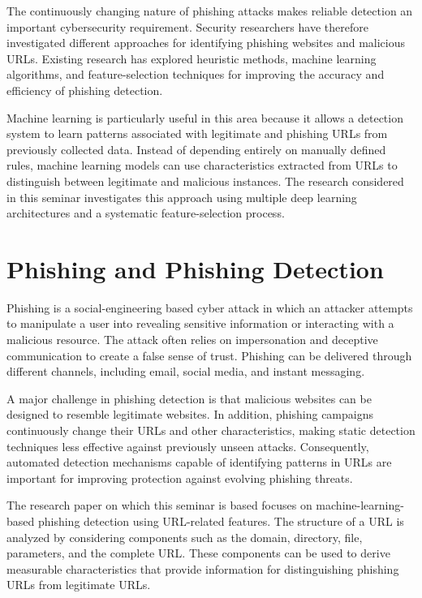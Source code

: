 \documentclass[12pt,a4paper]{report}
\begin{document}
The continuously changing nature of phishing attacks makes reliable
detection an important cybersecurity requirement. Security
researchers have therefore investigated different approaches for
identifying phishing websites and malicious URLs. Existing research
has explored heuristic methods, machine learning algorithms, and
feature-selection techniques for improving the accuracy and
efficiency of phishing detection.

Machine learning is particularly useful in this area because it
allows a detection system to learn patterns associated with
legitimate and phishing URLs from previously collected data. Instead
of depending entirely on manually defined rules, machine learning
models can use characteristics extracted from URLs to distinguish
between legitimate and malicious instances. The research considered
in this seminar investigates this approach using multiple deep
learning architectures and a systematic feature-selection process.

\section{Phishing and Phishing Detection}

Phishing is a social-engineering based cyber attack in which an
attacker attempts to manipulate a user into revealing sensitive
information or interacting with a malicious resource. The attack
often relies on impersonation and deceptive communication to create
a false sense of trust. Phishing can be delivered through different
channels, including email, social media, and instant messaging.

A major challenge in phishing detection is that malicious websites
can be designed to resemble legitimate websites. In addition,
phishing campaigns continuously change their URLs and other
characteristics, making static detection techniques less effective
against previously unseen attacks. Consequently, automated
detection mechanisms capable of identifying patterns in URLs are
important for improving protection against evolving phishing
threats.

The research paper on which this seminar is based focuses on
machine-learning-based phishing detection using URL-related
features. The structure of a URL is analyzed by considering
components such as the domain, directory, file, parameters, and the
complete URL. These components can be used to derive measurable
characteristics that provide information for distinguishing phishing
URLs from legitimate URLs.
\end{document}

